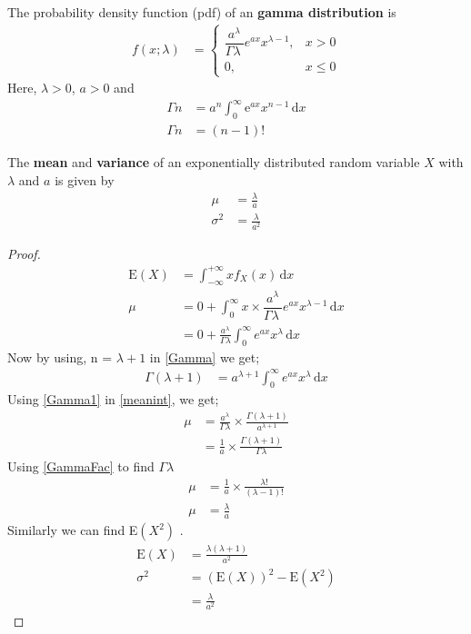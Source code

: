 \documentclass[twocolumn]{article}
\newtheorem{proof}[theorem]{Proof}
\providecommand{\brak}[1]{\ensuremath{\left(#1\right)}}
\begin{document}
\begin{definition}
The probability density function (pdf) of an \textbf{ gamma distribution} is
\begin{align}
f\brak{x;\lambda} &=
    \begin{cases}
    \dfrac{a^{\lambda}}{\Gamma{\lambda}\ } e^{ax}x^{\lambda-1} , & x > 0 \\
     0, &  x \leq 0
    \end{cases}
        \end{align}
Here, $\lambda > 0 $, $a>0$ and
\begin{align}
    \Gamma{n} &= a^{n} \int_{0}^{\infty} \mathrm{e}^{ax} x^{n -1} \, \mathrm{d}x \label{Gamma} \\
 \Gamma{n} &= \brak{n-1}! \label{GammaFac}   \end{align} 
\end{definition}
\begin{lemma}
The \textbf{mean} and \textbf{variance} of an exponentially distributed random variable $X$ with $\lambda$ and $a$ is given by
\begin{align}
    \mu &= \frac{\lambda}{a} \\
    \sigma^2 &= \frac{\lambda}{a^2}
\end{align}
\end{lemma}
\begin{proof}
\begin{align}
 \mathrm{E}\brak{X} &= \int_{-\infty}^{+\infty} xf_X\brak{x} \,\mathrm{d}x \\
 \mu &= 0 + \int_{0}^{\infty} x \times \dfrac{a^{\lambda}}{\Gamma{\lambda}\ } e^{ax}x^{\lambda-1} \, \mathrm{d}x \\
 &= 0 + \frac{ a^{\lambda}}{\Gamma \lambda} \int_0^\infty e^{ax}x^{\lambda} \, \mathrm{d}x  \label{meanint} 
 \end{align}
Now by using,  n = $ \lambda +1 $ in \eqref{Gamma} we get;
 \begin{align} 
  \Gamma \brak{ \lambda +1} &= a^{\lambda +1} \int_0^\infty e^{ax}x^{\lambda} \, \mathrm{d}x  \label{Gamma1}
  \end{align}
  Using \eqref{Gamma1} in \eqref{meanint}, we get;
  \begin{align}
 \mu &= \frac{a^\lambda}{\Gamma \lambda} \times \frac{\Gamma \brak{\lambda +1}}{ a^{\lambda +1} } \\
 &= \frac{1}{a} \times \frac{\Gamma \brak{\lambda+1}}{ \Gamma \lambda} 
 \end{align}
 Using  \eqref{GammaFac} to find $\Gamma \lambda$
 \begin{align}
 \mu &= \frac{1}{a} \times \frac{\lambda !}{\brak{\lambda -1 }!} \\
 \mu &= \frac{\lambda}{a} \label{GammaMean}
 \end{align}
Similarly we can find E\brak{X^2} .
\begin{align}
    \mathrm{E}\brak{X} &= \frac{\lambda \brak{\lambda +1}}{ a^2} \\
    \sigma^{2} &= \brak{\mathrm{E}\brak{X}}^2 - \mathrm{E}\brak{X^2} \\
    &=  \frac{\lambda}{a^2} \label{GammaVar}
\end{align}

\end{proof}
\end{document}
